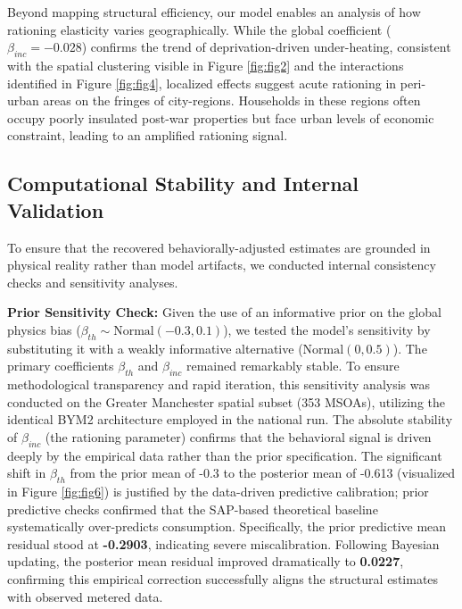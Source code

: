 \documentclass[11pt, a4paper, twocolumn]{article}
\begin{document}
Beyond mapping structural efficiency, our model enables an analysis of 
how rationing elasticity varies geographically. While the global 
coefficient (\(\beta_{inc} = -0.028\)) confirms the trend of 
deprivation-driven under-heating, consistent with the spatial clustering 
visible in Figure \ref{fig:fig2} and the interactions identified in Figure \ref{fig:fig4}, 
localized effects suggest acute rationing in peri-urban areas on the 
fringes of city-regions. 
 Households in these regions often occupy poorly insulated post-war 
properties but face urban levels of economic constraint, leading to an 
amplified rationing signal.

\subsection{Computational Stability and Internal Validation}\label{robustness-and-internal-validation}

To ensure that the recovered behaviorally-adjusted estimates are grounded in 
physical reality rather than model artifacts, we conducted internal 
consistency checks and sensitivity analyses.

\textbf{Prior Sensitivity Check:} Given the use of an informative prior 
on the global physics bias
(\(\beta_{th} \sim \text{Normal}(-0.3, 0.1)\)), we tested the model's 
sensitivity by substituting it with a weakly informative alternative 
(\(\text{Normal}(0, 0.5)\)). The primary
coefficients \(\beta_{th}\) and \(\beta_{inc}\) remained remarkably 
stable. To ensure methodological transparency and rapid iteration, this sensitivity analysis was conducted on the Greater Manchester spatial subset (353 MSOAs), utilizing the identical BYM2 architecture employed in the national run. The absolute stability of \(\beta_{inc}\) (the rationing parameter) 
confirms that the behavioral signal is driven deeply by the empirical data rather than 
the prior specification. The significant shift in \(\beta_{th}\) from the 
prior mean of -0.3 to the posterior mean of -0.613 (visualized in Figure \ref{fig:fig6}) 
is justified by the data-driven predictive calibration; prior predictive 
checks confirmed that the SAP-based theoretical baseline systematically 
over-predicts consumption. Specifically, the prior predictive mean residual 
stood at \textbf{-0.2903}, indicating severe miscalibration. Following Bayesian 
updating, the posterior mean residual improved dramatically to \textbf{0.0227}, 
confirming this empirical correction successfully aligns the structural estimates 
with observed metered data.
\end{document}
